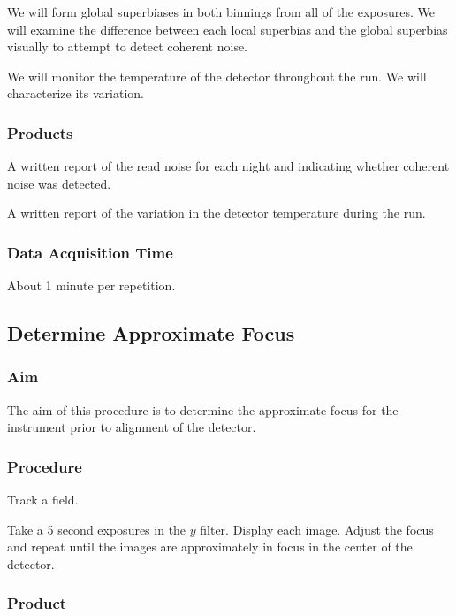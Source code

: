 \documentclass{article}
\begin{document}
We will form global superbiases in both binnings from all of the exposures. We will examine the difference between each local superbias and the global superbias visually to attempt to detect coherent noise.

We will monitor the temperature of the detector throughout the run. We will characterize its variation.

\subsubsection{Products}

A written report of the read noise for each night and indicating whether coherent noise was detected.

A written report of the variation in the detector temperature during the run.

\subsubsection{Data Acquisition Time}

About 1 minute per repetition.


\subsection{Determine Approximate Focus}

\subsubsection{Aim}

The aim of this procedure is to determine the approximate focus for the instrument prior to alignment of the detector.

\subsubsection{Procedure}

Track a field. 

Take a 5 second exposures in the $y$ filter. Display each image. Adjust the focus and repeat until the images are approximately in focus in the center of the detector.

\subsubsection{Product}
\end{document}
